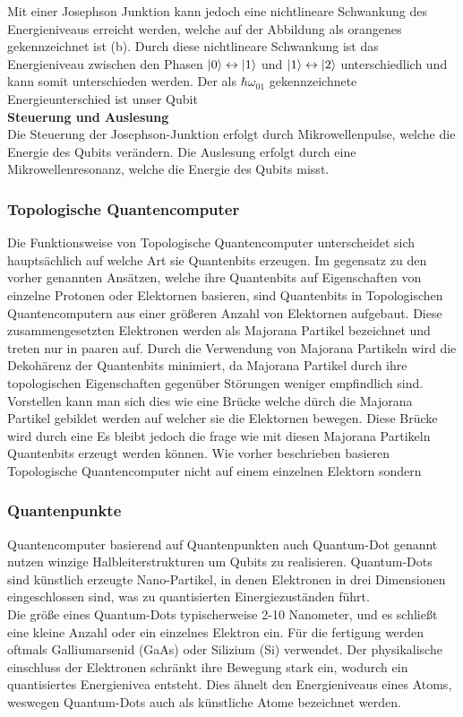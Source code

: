 Mit einer Josephson Junktion kann jedoch eine nichtlineare Schwankung des Energieniveaus erreicht werden, welche auf der Abbildung als orangenes  gekennzeichnet ist (b).
Durch diese nichtlineare Schwankung ist das Energieniveau zwischen den Phasen $\ket{0} \leftrightarrow \ket{1}$ und $\ket{1} \leftrightarrow \ket{2}$ unterschiedlich und kann somit unterschieden werden.
Der als $\hbar\omega_{01}$ gekennzeichnete Energieunterschied ist unser Qubit\\

\textbf{Steuerung und Auslesung}\\
Die Steuerung der Josephson-Junktion erfolgt durch Mikrowellenpulse, welche die Energie des Qubits verändern. Die Auslesung erfolgt durch eine Mikrowellenresonanz, welche die Energie des Qubits misst.\\

\subsubsection{Topologische Quantencomputer}
\label{subsub:topologische_quantencomputer}
Die Funktionsweise von Topologische Quantencomputer unterscheidet sich hauptsächlich auf welche Art sie Quantenbits erzeugen.
Im gegensatz zu den vorher genannten Ansätzen, welche ihre Quantenbits auf Eigenschaften von einzelne Protonen oder Elektornen basieren, sind Quantenbits in Topologischen Quantencomputern aus einer größeren Anzahl von Elektornen aufgebaut.
Diese zusammengesetzten Elektronen werden als Majorana Partikel bezeichnet und treten nur in paaren auf. Durch die Verwendung von Majorana Partikeln wird die Dekohärenz der Quantenbits minimiert, da Majorana Partikel durch ihre topologischen Eigenschaften gegenüber Störungen weniger empfindlich sind.
Vorstellen kann man sich dies wie eine Brücke welche dürch die Majorana Partikel gebildet werden auf welcher sie die Elektornen bewegen. Diese Brücke wird durch eine 
Es bleibt jedoch die frage wie mit diesen Majorana Partikeln Quantenbits erzeugt werden können. Wie vorher beschrieben basieren Topologische Quantencomputer nicht auf einem einzelnen Elektorn sondern 

\subsubsection{Quantenpunkte}
\label{subsub:quantenpunkte}
Quantencomputer basierend auf Quantenpunkten auch Quantum-Dot genannt nutzen winzige Halbleiterstrukturen um Qubits zu realisieren.
Quantum-Dots sind künstlich erzeugte Nano-Partikel, in denen Elektronen in drei Dimensionen eingeschlossen sind, was zu quantisierten Einergiezuständen führt.\\

Die größe eines Quantum-Dots typischerweise 2-10 Nanometer, und es schließt eine kleine Anzahl oder ein einzelnes Elektron ein.
Für die fertigung werden oftmals Galliumarsenid (GaAs) oder Silizium (Si) verwendet. Der physikalische einschluss der Elektronen schränkt ihre
Bewegung stark ein, wodurch ein quantisiertes Energienivea entsteht. Dies ähnelt den Energieniveaus eines Atoms, weswegen Quantum-Dots auch als künstliche Atome bezeichnet werden.\\

